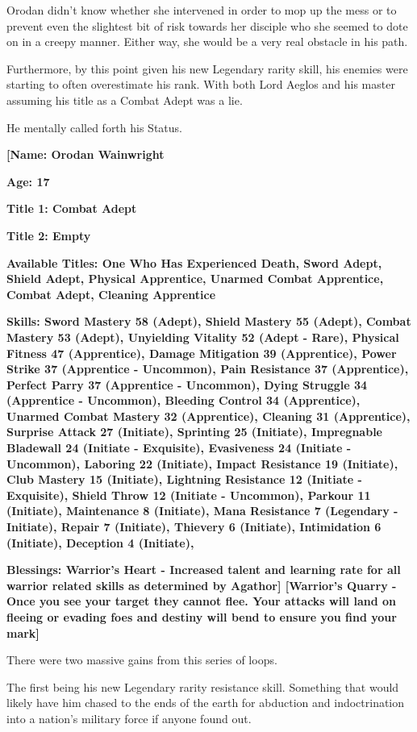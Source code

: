 \documentclass[a4paper,10pt]{book}
\begin{document}
Orodan didn’t know whether she intervened in order to mop up the mess or to prevent even the slightest bit of risk towards her disciple who she seemed to dote on in a creepy manner. Either way, she would be a very real obstacle in his path.\par
Furthermore, by this point given his new Legendary rarity skill, his enemies were starting to often overestimate his rank. With both Lord Aeglos and his master assuming his title as a Combat Adept was a lie.\par
He mentally called forth his Status.\par
\textbf{[Name: Orodan Wainwright}\par
\textbf{Age: 17}\par
\textbf{Title 1: Combat Adept}\par
\textbf{Title 2: Empty}\par
\textbf{Available Titles: One Who Has Experienced Death, Sword Adept, Shield Adept, Physical Apprentice, Unarmed Combat Apprentice, Combat Adept, Cleaning Apprentice}\par
\textbf{Skills: Sword Mastery 58 (Adept), Shield Mastery 55 (Adept), Combat Mastery 53 (Adept), Unyielding Vitality 52 (Adept - Rare), Physical Fitness 47 (Apprentice), Damage Mitigation 39 (Apprentice), Power Strike 37 (Apprentice - Uncommon), Pain Resistance 37 (Apprentice), Perfect Parry 37 (Apprentice - Uncommon), Dying Struggle 34 (Apprentice - Uncommon), Bleeding Control 34 (Apprentice), Unarmed Combat Mastery 32 (Apprentice), Cleaning 31 (Apprentice), Surprise Attack 27 (Initiate), Sprinting 25 (Initiate), Impregnable Bladewall 24 (Initiate - Exquisite), Evasiveness 24 (Initiate - Uncommon), Laboring 22 (Initiate), Impact Resistance 19 (Initiate), Club Mastery 15 (Initiate), Lightning Resistance 12 (Initiate - Exquisite), Shield Throw 12 (Initiate - Uncommon), Parkour 11 (Initiate), Maintenance 8 (Initiate), Mana Resistance 7 (Legendary - Initiate), Repair 7 (Initiate), Thievery 6 (Initiate), Intimidation 6 (Initiate), Deception 4 (Initiate),}\par
\textbf{Blessings: Warrior’s Heart - Increased talent and learning rate for all warrior related skills as determined by Agathor] [Warrior’s Quarry - Once you see your target they cannot flee. Your attacks will land on fleeing or evading foes and destiny will bend to ensure you find your mark]}\par
There were two massive gains from this series of loops.\par
The first being his new Legendary rarity resistance skill. Something that would likely have him chased to the ends of the earth for abduction and indoctrination into a nation’s military force if anyone found out.\par
\end{document}
